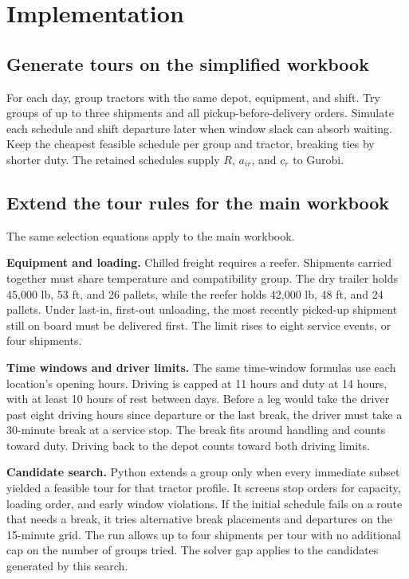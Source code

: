 \documentclass[11pt,letterpaper]{article}
\begin{document}
\newpage
\section{Implementation}

\subsection*{Generate tours on the simplified workbook}

For each day, group tractors with the same depot, equipment, and shift.
Try groups of up to three shipments and all pickup-before-delivery
orders. Simulate each schedule and shift departure later when window
slack can absorb waiting. Keep the cheapest feasible schedule per group
and tractor, breaking ties by shorter duty. The retained schedules
supply \(R\), \(a_{ir}\), and \(c_r\) to Gurobi.

\subsection*{Extend the tour rules for the main workbook}

The same selection equations apply to the main workbook.

\textbf{Equipment and loading.} Chilled freight requires a reefer.
Shipments carried together must share temperature and compatibility
group. The dry trailer holds 45,000 lb, 53 ft, and 26 pallets, while
the reefer holds 42,000 lb, 48 ft, and 24 pallets. Under last-in,
first-out unloading, the most recently picked-up shipment still on
board must be delivered first. The limit rises to eight service
events, or four shipments.

\textbf{Time windows and driver limits.} The same time-window formulas
use each location's opening hours. Driving is capped at 11 hours
and duty at 14 hours, with at least 10 hours of rest between days.
Before a leg would take the driver past eight driving hours since
departure or the last break, the driver must take a 30-minute break
at a service stop. The break fits around handling and counts toward
duty. Driving back to the depot counts toward both driving limits.

\textbf{Candidate search.} Python extends a group only when every
immediate subset yielded a feasible tour for that tractor profile.
It screens stop orders for capacity, loading order, and early window
violations. If the initial schedule fails on a route that needs a
break, it tries alternative break placements and departures on the
15-minute grid. The run allows up to four shipments per tour with
no additional cap on the number of groups tried. The solver gap
applies to the candidates generated by this search.
\end{document}
